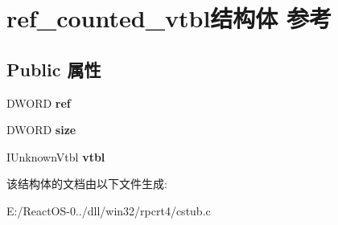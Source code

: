 \hypertarget{structref__counted__vtbl}{}\section{ref\+\_\+counted\+\_\+vtbl结构体 参考}
\label{structref__counted__vtbl}
\subsection*{Public 属性}
\begin{DoxyCompactItemize}
\item 
\mbox{\label{structref__counted__vtbl_af8f4a0f565edcd19f2345d7634cf4498}} 
D\+W\+O\+RD {\bfseries ref}
\item 
\mbox{\label{structref__counted__vtbl_a66fdbf6bd673dc7edc534a5f0afd6369}} 
D\+W\+O\+RD {\bfseries size}
\item 
\mbox{\label{structref__counted__vtbl_af41950add32fe8eec3cf721a480ffdaa}} 
I\+Unknown\+Vtbl {\bfseries vtbl}
\end{DoxyCompactItemize}


该结构体的文档由以下文件生成\+:\begin{DoxyCompactItemize}
\item 
E\+:/\+React\+O\+S-\/0../dll/win32/rpcrt4/cstub.\+c\end{DoxyCompactItemize}
